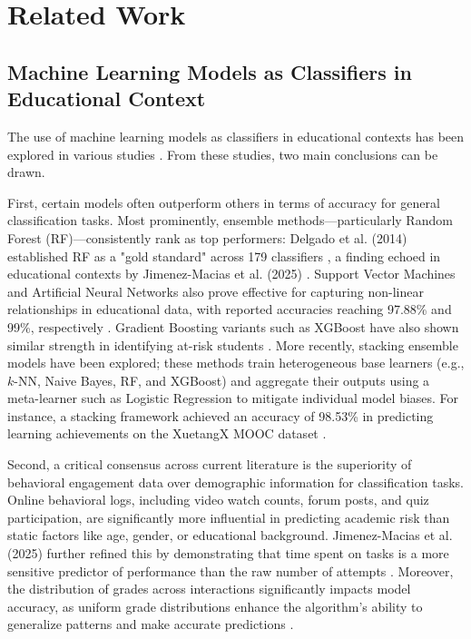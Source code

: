\section{Related Work}
\subsection{Machine Learning Models as Classifiers in Educational Context}
The use of machine learning models as classifiers in educational contexts has been explored in various studies \cite{Jimenez-Macias2025, Zhan2025, Tong2025, Alhakbani2022}. From these studies, two main conclusions can be drawn.

First, certain models often outperform others in terms of accuracy for general classification tasks. Most prominently, ensemble methods---particularly Random Forest (RF)---consistently rank as top performers: Delgado et al. (2014) established RF as a "gold standard" across 179 classifiers \cite{Delgado2014}, a finding echoed in educational contexts by Jimenez-Macias et al. (2025) \cite{Jimenez-Macias2025}. Support Vector Machines and Artificial Neural Networks also prove effective for capturing non-linear relationships in educational data, with reported accuracies reaching 97.88\% and 99\%, respectively \cite{Zhan2025, Alhakbani2022}. Gradient Boosting variants such as XGBoost have also shown similar strength in identifying at-risk students \cite{Alhakbani2022, Delgado2014}. More recently, stacking ensemble models have been explored; these methods train heterogeneous base learners (e.g., $k$-NN, Naive Bayes, RF, and XGBoost) and aggregate their outputs using a meta-learner such as Logistic Regression to mitigate individual model biases. For instance, a stacking framework achieved an accuracy of 98.53\% in predicting learning achievements on the XuetangX MOOC dataset \cite{Tong2025}.

Second, a critical consensus across current literature is the superiority of behavioral engagement data over demographic information for classification tasks. Online behavioral logs, including video watch counts, forum posts, and quiz participation, are significantly more influential in predicting academic risk than static factors like age, gender, or educational background. Jimenez-Macias et al. (2025) further refined this by demonstrating that time spent on tasks is a more sensitive predictor of performance than the raw number of attempts \cite{Jimenez-Macias2025}. Moreover, the distribution of grades across interactions significantly impacts model accuracy, as uniform grade distributions enhance the algorithm's ability to generalize patterns and make accurate predictions \cite{Jimenez-Macias2025}.

